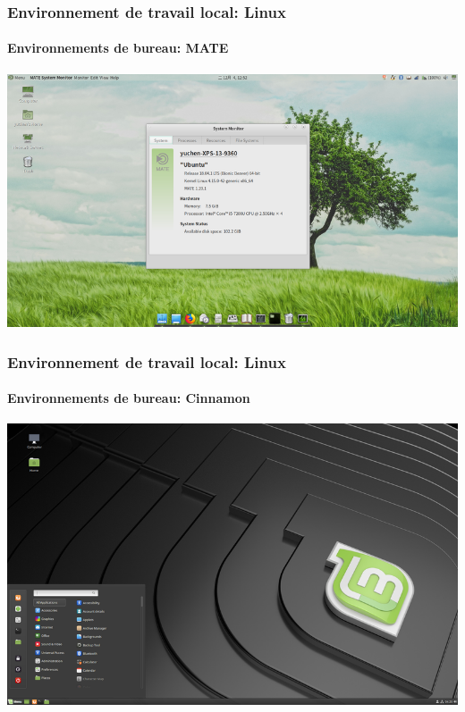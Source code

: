 \documentclass{beamer}
\begin{document}
\begin{frame}
\frametitle{Environnement de travail local: Linux}
\framesubtitle{Environnements de bureau: MATE}

\begin{center}
	\includegraphics[height=
.8\textheight]{../img/Bweb01-environnement/mate.png}
\end{center}

\end{frame}


\begin{frame}
\frametitle{Environnement de travail local: Linux}
\framesubtitle{Environnements de bureau: Cinnamon}

\begin{center}
	\includegraphics[height=
.8\textheight]{../img/Bweb01-environnement/cinnamon.png}
\end{center}

\end{frame}
\end{document}
